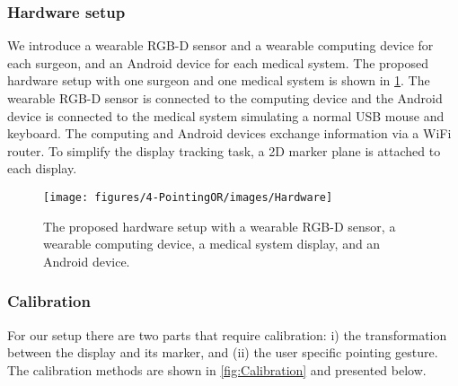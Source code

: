 \subsubsection{Hardware setup}
We introduce a wearable RGB-D sensor and a wearable computing device for each surgeon, and an Android device for each medical system. 
The proposed hardware setup with one surgeon and one medical system is shown in  \figurename{\ref{fig:Hardware}}.
The wearable RGB-D sensor is connected to the computing device and the Android device is connected to the medical system simulating a normal USB mouse and keyboard. The computing {and Android} devices exchange information via a WiFi router. To simplify the display tracking task, a 2D marker plane is attached to each display.
\begin{figure}
	\centering
	\texttt{[image: figures/4-PointingOR/images/Hardware]}
	\caption{The proposed hardware setup with a wearable RGB-D sensor, a wearable computing device, a medical system display, and an Android device.}
	\label{fig:Hardware}       %
\end{figure}
\subsubsection{Calibration}
For our setup there are two parts that require calibration: i) the transformation between the display and its marker, and (ii) the user specific pointing gesture. The calibration methods are shown in \figurename{\ref{fig:Calibration}} and presented below.
